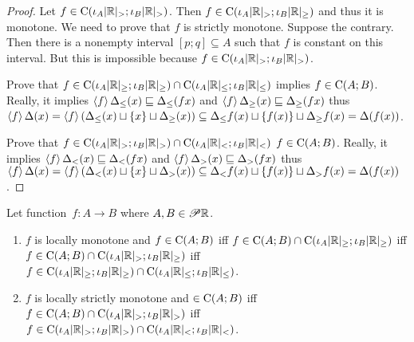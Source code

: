 \begin{proof}
Let $f\in\mathrm{C}(\iota_A|\mathbb{R}|_{>};\iota_B|\mathbb{R}|_{>})$. Then $f\in\mathrm{C}(\iota_A|\mathbb{R}|_{>};\iota_B|\mathbb{R}|_{\geq})$ and thus it is monotone.
We need to prove that $f$ is strictly monotone.
Suppose the contrary. Then there is a nonempty interval $[p;q]\subseteq A$ such that $f$ is constant on this interval.
But this is impossible because $f\in\mathrm{C}(\iota_A|\mathbb{R}|_{>};\iota_B|\mathbb{R}|_{>})$.

Prove that $f\in\mathrm{C}(\iota_A|\mathbb{R}|_{\geq};\iota_B|\mathbb{R}|_{\geq})\cap
\mathrm{C}(\iota_A|\mathbb{R}|_{\leq};\iota_B|\mathbb{R}|_{\leq})$ implies
$f\in\mathrm{C}(A;B)$. Really, it implies
$\left\langle f\right\rangle\Delta_{\leq}(x)\sqsubseteq\Delta_{\leq}(fx)$ and $\left\langle f\right\rangle\Delta_{\geq}(x)\sqsubseteq\Delta_{\geq}(fx)$
thus $\left\langle f\right\rangle\Delta(x) = \left\langle f\right\rangle(\Delta_{\leq}(x)\sqcup\{x\}\sqcup\Delta_{\geq}(x)) \subseteq
\Delta_{\leq}f(x)\sqcup\{f(x)\}\sqcup\Delta_{\geq}f(x) =
\Delta(f(x))$.

Prove that $f\in\mathrm{C}(\iota_A|\mathbb{R}|_{>};\iota_B|\mathbb{R}|_{>})\cap
\mathrm{C}(\iota_A|\mathbb{R}|_{<};\iota_B|\mathbb{R}|_{<})$
$f\in\mathrm{C}(A;B)$. Really, it implies
$\left\langle f\right\rangle\Delta_{<}(x)\sqsubseteq\Delta_{<}(fx)$ and $\left\langle f\right\rangle\Delta_{>}(x)\sqsubseteq\Delta_{>}(fx)$
thus $\left\langle f\right\rangle\Delta(x) = \left\langle f\right\rangle(\Delta_{<}(x)\sqcup\{x\}\sqcup\Delta_{>}(x)) \subseteq
\Delta_{<}f(x)\sqcup\{f(x)\}\sqcup\Delta_{>}f(x) = \Delta(f(x))$.
\end{proof}

\begin{thm}
Let function~$f:A\rightarrow B$ where $A,B\in\mathscr{P}\mathbb{R}$.
\begin{enumerate}
\item $f$ is locally monotone and $f\in\mathrm{C}(A;B)$ iff
$f\in\mathrm{C}(A;B)\cap\mathrm{C}(\iota_A|\mathbb{R}|_{\geq};\iota_B|\mathbb{R}|_{\geq})$ iff
$f\in\mathrm{C}(A;B)\cap\mathrm{C}(\iota_A|\mathbb{R}|_{>};\iota_B|\mathbb{R}|_{\geq})$ iff
$f\in\mathrm{C}(\iota_A|\mathbb{R}|_{\geq};\iota_B|\mathbb{R}|_{\geq})\cap
\mathrm{C}(\iota_A|\mathbb{R}|_{\leq};\iota_B|\mathbb{R}|_{\leq})$.
\item $f$ is locally strictly monotone and $\in\mathrm{C}(A;B)$ iff
$f\in\mathrm{C}(A;B)\cap\mathrm{C}(\iota_A|\mathbb{R}|_{>};\iota_B|\mathbb{R}|_{>})$ iff
$f\in\mathrm{C}(\iota_A|\mathbb{R}|_{>};\iota_B|\mathbb{R}|_{>})\cap
\mathrm{C}(\iota_A|\mathbb{R}|_{<};\iota_B|\mathbb{R}|_{<})$.
\end{enumerate}
\end{thm}


